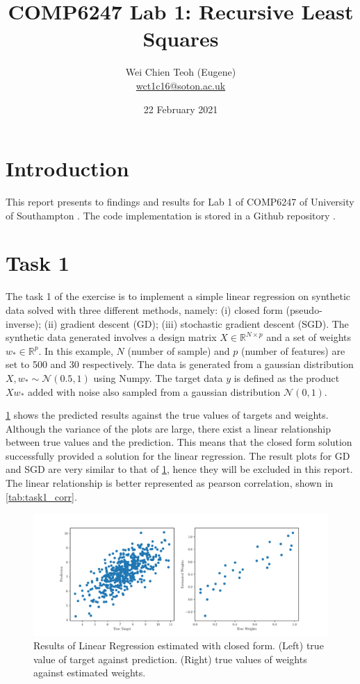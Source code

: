 \documentclass{article}
\title{COMP6247 Lab 1: Recursive Least Squares}
\author{Wei Chien Teoh (Eugene)\\\bigskip \href{mailto:wct1c16@soton.ac.uk}{wct1c16@soton.ac.uk}}
\date{22 February 2021}
\begin{document}
\maketitle

\section{Introduction}

This report presents to findings and results for Lab 1 of COMP6247 of University of Southampton \cite{lab1}. The code implementation is stored in a Github repository \cite{github}.

\section{Task 1} \label{section:task-1}

The task 1 of the exercise is to implement a simple linear regression on synthetic data solved with three different methods, namely: (i) closed form (pseudo-inverse); (ii) gradient descent (GD); (iii) stochastic gradient descent (SGD). The synthetic data generated involves a design matrix $X \in \mathbb{R}^{N \times p}$ and a set of weights $w_* \in \mathbb{R}^p$. In this example, $N$ (number of sample) and $p$ (number of features) are set to 500 and 30 respectively. The data is generated from a gaussian distribution $X, w_* \sim \mathcal{N}(0.5, 1)$ using Numpy. The target data $y$ is defined as the product $Xw_*$ added with noise also sampled from a gaussian distribution $\mathcal{N}(0, 1)$.

\cref{fig:lr_closed} shows the predicted results against the true values of targets and weights. Although the variance of the plots are large, there exist a linear relationship between true values and the prediction. This means that the closed form solution successfully provided a solution for the linear regression. The result plots for GD and SGD are very similar to that of \cref{fig:lr_closed}, hence they will be excluded in this report. The linear relationship is better represented as pearson correlation, shown in \cref{tab:task1_corr}.

\begin{figure}[h!]
    \centering
    \includegraphics[width=\textwidth]{Figures/closed.pdf}
    \caption{Results of Linear Regression estimated with closed form. (Left) true value of target against prediction. (Right) true values of weights against estimated weights.}
    \label{fig:lr_closed}
\end{figure}
\end{document}
